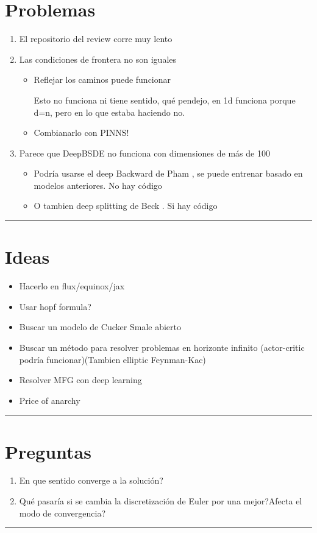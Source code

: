 \documentclass{article}
\newcommand{\HRule}{\rule{\linewidth}{0.5mm}}
\begin{document}
	\section*{Problemas}
	\begin{enumerate}
		\item El repositorio del review corre muy lento \bluecheck
		\item Las condiciones de frontera no son iguales
		\begin{itemize}
			\item Reflejar los caminos puede funcionar \redwrong 
			
			Esto no funciona ni tiene sentido, qué pendejo, en 1d funciona porque d=n, pero en lo que estaba haciendo no.
			\item Combianarlo con PINNS!
		\end{itemize}
		\item Parece que DeepBSDE no funciona con dimensiones de más de 100
		\begin{itemize}
			\item Podría usarse el deep Backward de Pham \cite{hure_deep_2020}, se puede entrenar basado en modelos anteriores. No hay código
			\item O tambien deep splitting de Beck \cite{beck_deep_2021}. Si hay código
		\end{itemize}
	\end{enumerate}
    \HRule\par
    \section*{Ideas}
    \begin{itemize}
    	\item Hacerlo en flux/equinox/jax
    	\item Usar hopf formula? 
    	\item Buscar un modelo de Cucker Smale abierto
    	\item Buscar un método para resolver problemas en horizonte infinito (actor-critic podría funcionar)(Tambien elliptic Feynman-Kac)
    	\item Resolver MFG con deep learning
    	\item Price of anarchy
    \end{itemize}
    \HRule\par
    \section*{Preguntas}
	\begin{enumerate}
	\item En que sentido converge a la solución?
	\item Qué pasaría si se cambia la discretización de Euler por una mejor?Afecta el modo de convergencia?
	\end{enumerate}
    \HRule\par
\end{document}
